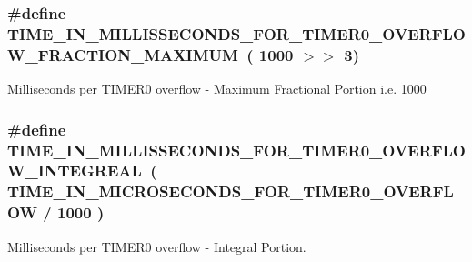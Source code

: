 \subsubsection[{\texorpdfstring{T\+I\+M\+E\+\_\+\+I\+N\+\_\+\+M\+I\+L\+L\+I\+S\+S\+E\+C\+O\+N\+D\+S\+\_\+\+F\+O\+R\+\_\+\+T\+I\+M\+E\+R0\+\_\+\+O\+V\+E\+R\+F\+L\+O\+W\+\_\+\+F\+R\+A\+C\+T\+I\+O\+N\+\_\+\+M\+A\+X\+I\+M\+UM}{TIME_IN_MILLISSECONDS_FOR_TIMER0_OVERFLOW_FRACTION_MAXIMUM}}]{\setlength{\rightskip}{0pt plus 5cm}\#define T\+I\+M\+E\+\_\+\+I\+N\+\_\+\+M\+I\+L\+L\+I\+S\+S\+E\+C\+O\+N\+D\+S\+\_\+\+F\+O\+R\+\_\+\+T\+I\+M\+E\+R0\+\_\+\+O\+V\+E\+R\+F\+L\+O\+W\+\_\+\+F\+R\+A\+C\+T\+I\+O\+N\+\_\+\+M\+A\+X\+I\+M\+UM~( 1000 $>$$>$ 3)}\hypertarget{group__custom__timer_ga2322cd9c5ca701585ac9c61123216a67}{}\label{group__custom__timer_ga2322cd9c5ca701585ac9c61123216a67}
Milliseconds per T\+I\+M\+E\+R0 overflow -\/ Maximum Fractional Portion i.\+e. 1000 
\subsubsection[{\texorpdfstring{T\+I\+M\+E\+\_\+\+I\+N\+\_\+\+M\+I\+L\+L\+I\+S\+S\+E\+C\+O\+N\+D\+S\+\_\+\+F\+O\+R\+\_\+\+T\+I\+M\+E\+R0\+\_\+\+O\+V\+E\+R\+F\+L\+O\+W\+\_\+\+I\+N\+T\+E\+G\+R\+E\+AL}{TIME_IN_MILLISSECONDS_FOR_TIMER0_OVERFLOW_INTEGREAL}}]{\setlength{\rightskip}{0pt plus 5cm}\#define T\+I\+M\+E\+\_\+\+I\+N\+\_\+\+M\+I\+L\+L\+I\+S\+S\+E\+C\+O\+N\+D\+S\+\_\+\+F\+O\+R\+\_\+\+T\+I\+M\+E\+R0\+\_\+\+O\+V\+E\+R\+F\+L\+O\+W\+\_\+\+I\+N\+T\+E\+G\+R\+E\+AL~( {\bf T\+I\+M\+E\+\_\+\+I\+N\+\_\+\+M\+I\+C\+R\+O\+S\+E\+C\+O\+N\+D\+S\+\_\+\+F\+O\+R\+\_\+\+T\+I\+M\+E\+R0\+\_\+\+O\+V\+E\+R\+F\+L\+OW} / 1000 )}\hypertarget{group__custom__timer_gad18b0b3ac32d120785d5437328854938}{}\label{group__custom__timer_gad18b0b3ac32d120785d5437328854938}
Milliseconds per T\+I\+M\+E\+R0 overflow -\/ Integral Portion. 

